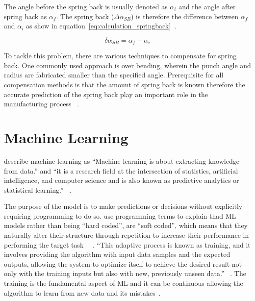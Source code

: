 The angle before the spring back is usually denoted as $\alpha_i$ and the angle after spring back as $\alpha_f$.
The spring back ($\Delta \alpha_{SB}$) is therefore the difference between $\alpha_f$ and
$\alpha_i$ as show in equation~\ref*{eq:calculation_springback}~\cite[p. 6]{cruz_applicationmachinelearning_2021}.


\begin{tcolorbox}[arc=0pt,boxrule=0.5pt]
    \begin{equation}
        \delta \alpha_{SB} = \alpha_f - \alpha_i
        \label{eq:calculation_springback}
    \end{equation}
\end{tcolorbox}

To tackle this problem, there are various techniques to compensate for spring back.
One commonly used approach is over bending, wherein the punch angle and radius are fabricated smaller than the
specified angle.
Prerequisite for all compensation methods is that the amount of spring back is known therefore
the accurate prediction of the spring back play an important role in the manufacturing
process ~\cite[p. 114]{groover_fundamentalsmodernmanufacturing_2020}.


\section{Machine Learning}\label{sec:machine-learning}
\cite{muller_introductionmachinelearning_2016} describe machine learning as ``Machine learning is about extracting
knowledge from data.'' and ``it is a research field at the intersection of statistics, artificial intelligence, and
computer science and is also known as predictive analytics or statistical learning.''
~\cite[p. 1]{muller_introductionmachinelearning_2016}.

The purpose of the model is to make predictions or decisions without explicitly requiring programming to do so.
\cite{el2015machine} use programming terms to explain thad ML models rather than being ``hard coded'', are ``soft
coded'', which means that they naturally alter their structure through repetition to increase their performance in
performing the target task ~\cite[pp. 4]{el2015machine}~\cite[pp. 151--170]{koza1996automated}.
``This adaptive process is known as training, and it involves providing the algorithm with input data samples and the
expected outputs, allowing the system to optimize itself to achieve the desired result not only with the training
inputs but also with new, previously unseen data.''
~\cite[pp. 4]{el2015machine}.
The training is the fundamental aspect of \ac{ML} and it can be continuous allowing the algorithm to
learn from new data and its mistakes~\cite[pp. 4]{el2015machine}.

